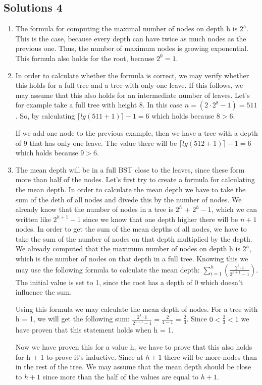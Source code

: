 \documentclass{article}
\begin{document}
\subsection*{Solutions 4}
\begin{enumerate}
  \item The formula for computing the maximal number of nodes on depth h is $2^h$. This is the case, because every depth can have twice as much nodes as the previous one. Thus, the number of maximum nodes is growing exponential. This formula also holds for the root, because $2^0 = 1$.
  \item In order to calculate whether the formula is correct, we may verify whether this holds for a full tree and a tree with only one leave. If this follows, we may assume that this also holds for an intermediate number of leaves. Let's for example take a full tree with height 8. In this case $n = (2 \cdot 2^8 - 1) = 511$. So, by calculating $\lceil lg(511+1) \rceil - 1 = 6$ which holds because $8 > 6$.

  If we add one node to the previous example, then we have a tree with a depth of 9 that has only one leave. The value there will be $\lceil lg(512+1) \rceil - 1 = 6$ which holds because $9 > 6$.
  \item The mean depth will be in a full BST close to the leaves, since these form more than half of the nodes. Let's first try to create a formula for calculating the mean depth. In order to calculate the mean depth we have to take the sum of the deth of all nodes and divede this by the number of nodes. We already know that the number of nodes in a tree is $2^h$ + $2^h - 1$, which we can written like $2^{h + 1} - 1$ since we know that one depth higher there will be $n + 1$ nodes. In order to get the sum of the mean depths of all nodes, we have to take the sum of the number of nodes on that depth multiplied by the depth. We already computed that the maximum number of nodes on depth h is $2^h$, which is the number of nodes on that depth in a full tree. Knowing this we may use the following formula to calculate the mean depth: $\sum^{h}_{i = 1}(\frac{2^i \cdot i}{2^{h + 1} - 1})$. The initial value is set to 1, since the root has a depth of 0 which doesn't influence the sum.

  Using this formula we may calculate the mean depth of nodes. For a tree with h = 1, we will get the following sum: $\frac{2^1 \cdot 1}{2^{1 + 1} - 1} = \frac{2}{4 - 1} = \frac{2}{3}$. Since $0 < \frac{2}{3} < 1$ we have proven that this statement holds when h = 1.

  Now we have proven this for a value h, we have to prove that this also holds for h + 1 to prove it's inductive. Since at $h + 1$ there will be more nodes than in the rest of the tree. We may assume that the mean depth should be close to $h + 1$ since more than the half of the values are equal to $h + 1$.

\end{enumerate}
\end{document}
